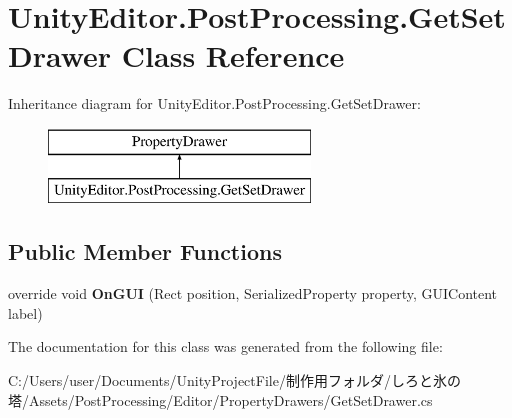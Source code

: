 \hypertarget{class_unity_editor_1_1_post_processing_1_1_get_set_drawer}{}\section{Unity\+Editor.\+Post\+Processing.\+Get\+Set\+Drawer Class Reference}
\label{class_unity_editor_1_1_post_processing_1_1_get_set_drawer}
Inheritance diagram for Unity\+Editor.\+Post\+Processing.\+Get\+Set\+Drawer\+:\begin{figure}[H]
\begin{center}
\leavevmode
\includegraphics[height=2.000000cm]{class_unity_editor_1_1_post_processing_1_1_get_set_drawer}
\end{center}
\end{figure}
\subsection*{Public Member Functions}
\begin{DoxyCompactItemize}
\item 
\mbox{\label{class_unity_editor_1_1_post_processing_1_1_get_set_drawer_a4223a2db683fc9ab228eabdc3af38a98}} 
override void {\bfseries On\+G\+UI} (Rect position, Serialized\+Property property, G\+U\+I\+Content label)
\end{DoxyCompactItemize}


The documentation for this class was generated from the following file\+:\begin{DoxyCompactItemize}
\item 
C\+:/\+Users/user/\+Documents/\+Unity\+Project\+File/制作用フォルダ/しろと氷の塔/\+Assets/\+Post\+Processing/\+Editor/\+Property\+Drawers/Get\+Set\+Drawer.\+cs\end{DoxyCompactItemize}
